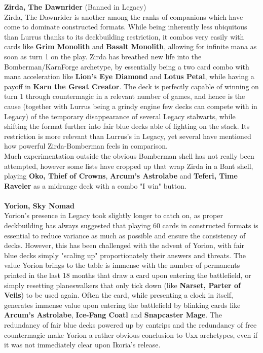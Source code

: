 \documentclass{report}
\begin{document}
\textbf{Zirda, The Dawnrider} (Banned in Legacy)\\
Zirda, The Dawnrider is another among the ranks of companions which have come to dominate constructed formats. While being inherently less ubiquitous than Lurrus thanks to its deckbuilding restriction, it combos very easily with cards like \textbf{Grim Monolith} and \textbf{Basalt Monolith}, allowing for infinite mana as soon as turn 1 on the play. Zirda has breathed new life into the Bomberman/KarnForge archetype, by essentially being a two card combo with mana acceleration like \textbf{Lion's Eye Diamond} and \textbf{Lotus Petal}, while having a payoff in \textbf{Karn the Great Creator}. The deck is perfectly capable of winning on turn 1 through countermagic in a relevant number of games, and hence is the cause (together with Lurrus being a grindy engine few decks can compete with in Legacy) of the temporary disappearance of several Legacy stalwarts, while shifting the format further into fair blue decks able of fighting on the stack. Its restriction is more relevant than Lurrus's in Legacy, yet several have mentioned how powerful Zirda-Bomberman feels in comparison.\\
Much experimentation outside the obvious Bomberman shell has not really been attempted, however some lists have cropped up that wrap Zirda in a Bant shell, playing \textbf{Oko, Thief of Crowns}, \textbf{Arcum's Astrolabe} and \textbf{Teferi, Time Raveler} as a midrange deck with a combo "I win" button.\\\\
\textbf{Yorion, Sky Nomad}\\
Yorion's presence in Legacy took slightly longer to catch on, as proper deckbuilding has always suggested that playing 60 cards in constructed formats is essential to reduce variance as much as possible and ensure the consistency of decks. However, this has been challenged with the advent of Yorion, with fair blue decks simply "scaling up" proportionately their answers and threats. The value Yorion brings to the table is immense with the number of permanents printed in the last 18 months that draw a card upon entering the battlefield, or simply resetting planeswalkers that only tick down (like \textbf{Narset, Parter of Veils}) to be used again. Often the card, while presenting a clock in itself, generates immense value upon entering the battlefield by blinking cards like \textbf{Arcum's Astrolabe}, \textbf{Ice-Fang Coatl} and \textbf{Snapcaster Mage}. The redundancy of fair blue decks powered up by cantrips and the redundancy of free countermagic make Yorion a rather obvious conclusion to Uxx archetypes, even if it was not immediately clear upon Ikoria's release.\\\\
\end{document}
